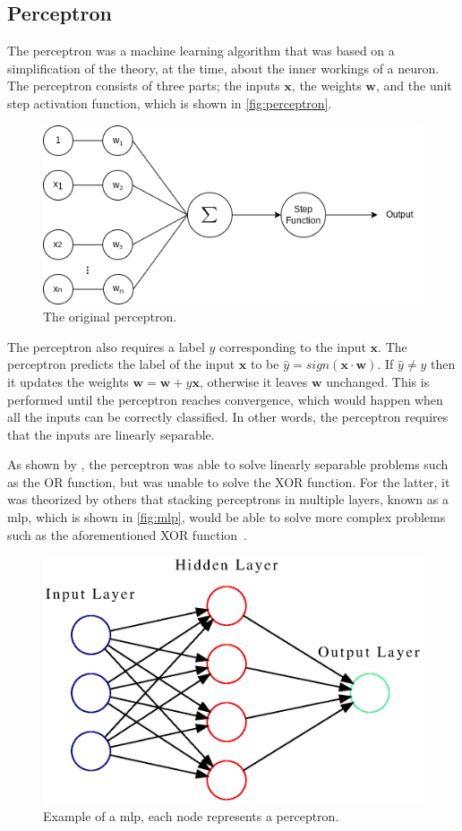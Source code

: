 \subsection{Perceptron}
The perceptron\cite{perceptron, perceptron2} was a machine learning algorithm that was based on a simplification of the theory, at the time, about the inner workings of a neuron. The perceptron consists of three parts; the inputs $\mathbf{x}$, the weights $\mathbf{w}$, and the unit step activation function, which is shown in \autoref{fig:perceptron}.
\begin{figure}[htb]
    \centering
    \includegraphics[width=0.7\linewidth]{resources/related_works/perceptron}
    \caption[The Original Perceptron]{The original perceptron.}
    \label{fig:perceptron}
\end{figure}
\par
The perceptron also requires a label $y$ corresponding to the input $\mathbf{x}$. The perceptron predicts the label of the input $\mathbf{x}$ to be $\hat{y}=sign(\mathbf{x}\cdot\mathbf{w})$. If $\hat{y}\neq y$ then it updates the weights $\mathbf{w}=\mathbf{w}+y\mathbf{x}$, otherwise it leaves $\mathbf{w}$ unchanged. This is performed until the perceptron reaches convergence, which would happen when all the inputs can be correctly classified. In other words, the perceptron requires that the inputs are linearly separable.
\par
As shown by \textcite{perceptron3}, the perceptron was able to solve linearly separable problems such as the OR function, but was unable to solve the XOR function. For the latter, it was theorized by others that stacking perceptrons in multiple layers, known as a \gls*{mlp}, which is shown in \autoref{fig:mlp}, would be able to solve more complex problems such as the aforementioned XOR function~\cite{perceptron_misconceptions}.
\par
\begin{figure}[htb]
    \centering
    \includegraphics[width=0.7\linewidth]{resources/related_works/mlp.gv.eps}
    \caption[MLP Example]{Example of a \gls*{mlp}, each node represents a perceptron.}
    \label{fig:mlp}
\end{figure}

